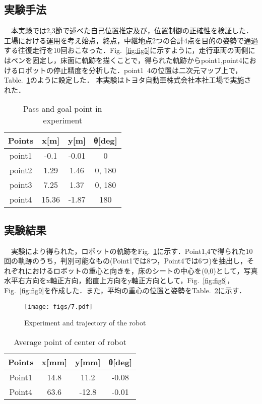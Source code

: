 \subsection{実験手法}
　本実験では2,3節で述べた自己位置推定及び，位置制御の正確性を検証した．工場における運用を考え始点，終点，中継地点2つの合計4点を目的の姿勢で通過する往復走行を10回おこなった．Fig.~\ref{fig:fig5}に示すように，走行車両の両側にはペンを固定し，床面に軌跡を描くことで，得られた軌跡からpoint1,point4におけるロボットの停止精度を分析した．point1~4の位置は二次元マップ上で，Table.~\ref{table1}のように設定した．
本実験はトヨタ自動車株式会社本社工場で実施された． 

\begin{table}[h]
    \caption{Pass and goal point in experiment}
    \label{table1}
    \centering
    \begin{tabular}{cccc} \hline
      Points & x[m] & y[m] & θ[deg]\\
      \hline \hline
      point1 & -0.1 & -0.01 & 0\\
      point2 & 1.29 & 1.46 & 0, 180\\
      point3 & 7.25 & 1.37 & 0, 180\\
      point4 & 15.36 & -1.87 & 180\\
      \hline
    \end{tabular}
\end{table}

\subsection{実験結果}
　実験により得られた，ロボットの軌跡をFig.~\ref{fig:fig7}に示す．Point1,4で得られた10回の軌跡のうち，判別可能なもの(Point1では8つ，Point4では6つ)を抽出し，それぞれにおけるロボットの重心と向きを，床のシートの中心を(0,0)として，写真水平右方向をx軸正方向，鉛直上方向をy軸正方向として，Fig.~\ref{fig:fig8}，Fig.~\ref{fig:fig9}を作成した．また，平均の重心の位置と姿勢をTable.~\ref{table2}に示す．

\begin{figure}[h]
\texttt{[image: figs/7.pdf]}
\caption{Experiment and trajectory of the robot}
\label{fig:fig7}
\end{figure}

\begin{table}[h]
    \caption{Average point of center of robot}
    \label{table2}
    \centering
    \begin{tabular}{cccc} \hline
      Points & x[mm] & y[mm] & θ[deg]\\
      \hline \hline
      Point1 & 14.8 & 11.2 & -0.08\\
      Point4 & 63.6 & -12.8 & -0.01\\
      \hline
    \end{tabular}
\end{table}

